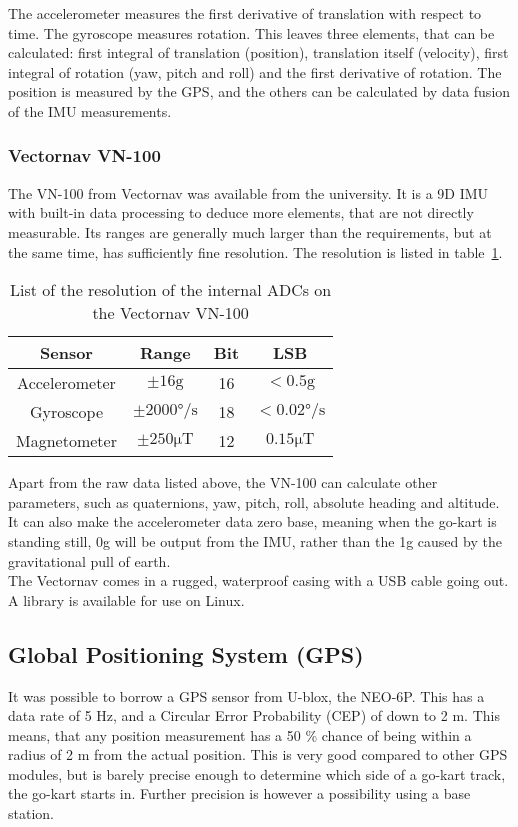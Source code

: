 The accelerometer measures the first derivative of translation with respect to time. 
The gyroscope measures rotation.
This leaves three elements, that can be calculated: first integral of translation (position), translation itself (velocity), first integral of rotation (yaw, pitch and roll) and the first derivative of rotation.
The position is measured by the GPS, and the others can be calculated by data fusion of the IMU measurements.\\

\subsubsection*{Vectornav VN-100}
The VN-100 from Vectornav was available from the university.
It is a 9D IMU with built-in data processing to deduce more elements, that are not directly measurable.
Its ranges are generally much larger than the requirements, but at the same time, has sufficiently fine resolution.
The resolution is listed in table~\ref{tab:vectornav_measurement_resolution}.

\begin{table}[h]
	\centering
	\begin{tabular}{ c | c c c}
		{\textbf{Sensor}} & {\textbf{Range}} & {\textbf{Bit}} & {\textbf{LSB}}\\
		\hline
		{Accelerometer}	& { $\pm 16 \mathrm{g}$}					& {16}	& {$< 0.5 \mathrm{g}$}\\
		{Gyroscope}		& { $\pm 2000\si{\degree \per \second}$ }	& {18}	& {$<0.02 \si{\degree \per \second}$}\\
		{Magnetometer}	& { $\pm 250 \si{\micro \tesla}$}			& {12}	& {$0.15 \si{\micro \tesla}$}
	\end{tabular}
	\caption{List of the resolution of the internal ADCs on the Vectornav VN-100}
	\label{tab:vectornav_measurement_resolution}
\end{table}

Apart from the raw data listed above, the VN-100 can calculate other parameters, such as quaternions, yaw, pitch, roll, absolute heading and altitude.
It can also make the accelerometer data zero base, meaning when the go-kart is standing still, 0g will be output from the IMU, rather than the 1g caused by the gravitational pull of earth. \\

The Vectornav comes in a rugged, waterproof casing with a USB cable going out.
A library is available for use on Linux.

\subsection{Global Positioning System (GPS)}
It was possible to borrow a GPS sensor from U-blox, the NEO-6P.
This has a data rate of 5 Hz, and a Circular Error Probability (CEP) of down to 2 m.
This means, that any position measurement has a 50 \% chance of being within a radius of 2 m from the actual position. 
This is very good compared to other GPS modules, but is barely precise enough to determine which side of a go-kart track, the go-kart starts in. 
Further precision is however a possibility using a base station.\\

